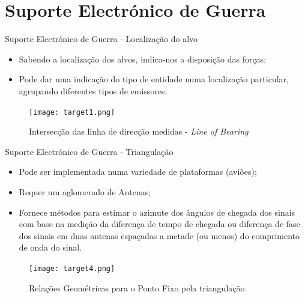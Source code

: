\documentclass[portuguese,10pt]{beamer}
\begin{document}
\section{Suporte Electrónico de Guerra}
    
    \begin{frame}{Suporte Electrónico de Guerra - Localização do alvo}
   
    \begin{itemize}
        \item Sabendo a localização dos alvos, indica-nos a disposição das forças;
       
        \item Pode dar uma indicação do tipo de entidade numa localização particular, agrupando diferentes tipos de emissores.
        
    \end{itemize}
    \begin{figure}[ht]
\centering
\texttt{[image: target1.png]}
\caption{Intersecção das linha de direcção medidas - \textit{Line of Bearing}}
\label{target1}
\end{figure}
\end{frame}

\begin{frame}{Suporte Electrónico de Guerra - Triangulação}
   
    \begin{itemize}
        \item Pode ser implementada numa variedade de plataformas (aviões);
       
        \item Requer um aglomerado de Antenas; 
        
        \item Fornece métodos para estimar o azimute dos ângulos de chegada dos sinais com base na medição da diferença de tempo de chegada ou diferença de fase dos sinais em duas antenas espaçadas a metade (ou menos) do comprimento de onda do sinal.
        
    \end{itemize}
    \begin{figure}[ht]
\centering
\texttt{[image: target4.png]}
\caption{Relações Geométricas para o Ponto Fixo pela triangulação}
\label{target4}
\end{figure}
\end{frame}
\end{document}
